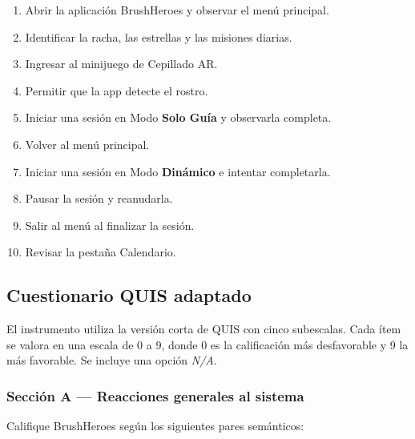 \documentclass[12pt, a4paper]{article}
\begin{document}
\begin{enumerate}[leftmargin=1.5cm, itemsep=3pt]
  \item Abrir la aplicación BrushHeroes y observar el menú principal.
  \item Identificar la racha, las estrellas y las misiones diarias.
  \item Ingresar al minijuego de Cepillado AR.
  \item Permitir que la app detecte el rostro.
  \item Iniciar una sesión en Modo \textbf{Solo Guía} y observarla completa.
  \item Volver al menú principal.
  \item Iniciar una sesión en Modo \textbf{Dinámico} e intentar completarla.
  \item Pausar la sesión y reanudarla.
  \item Salir al menú al finalizar la sesión.
  \item Revisar la pestaña Calendario.
\end{enumerate}

\subsection{Cuestionario QUIS adaptado}

El instrumento utiliza la versión corta de QUIS con cinco subescalas. Cada
ítem se valora en una escala de 0 a 9, donde 0 es la calificación más
desfavorable y 9 la más favorable. Se incluye una opción \textit{N/A}.

\subsubsection{Sección A — Reacciones generales al sistema}

Califique BrushHeroes según los siguientes pares semánticos:
\end{document}
